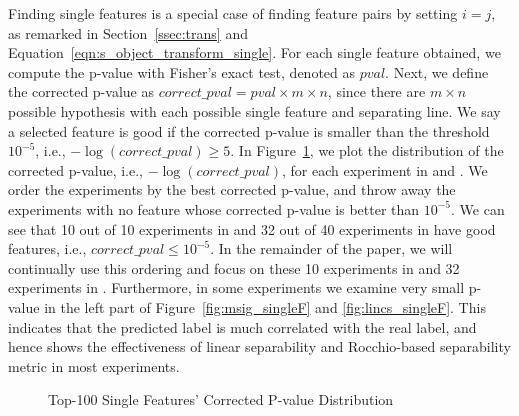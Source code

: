  Finding \topk single features is a special case of finding feature pairs by setting $i=j$, as remarked in Section~\ref{ssec:trans} and Equation~\ref{eqn:s_object_transform_single}. For each single feature obtained, we compute the p-value with Fisher's exact test, denoted as $pval$. Next, we define the corrected p-value as $correct\_pval= pval\times m \times n$, since there are $m \times n$ possible hypothesis with each possible single feature and separating line. We say a selected feature is good if the corrected p-value is smaller than the threshold $10^{-5}$, i.e., $-\log (correct\_pval)\geq5$. In Figure~\ref{fig:singleF}, we plot the distribution of the corrected p-value, i.e., $-\log (correct\_pval)$, for each experiment in \msig and \lincs. We order the experiments by the best corrected p-value, and throw away the experiments with no feature whose corrected p-value is better than $10^{-5}$. We can see that 10 out of 10 experiments in \msig and 32 out of 40 experiments in \lincs have good features, i.e., $correct\_pval \leq 10^{-5}$. In the remainder of the paper, we will continually use this ordering and focus on these 10 experiments in \msig and 32 experiments in \lincs. Furthermore, in some experiments we examine very small p-value in the left part of Figure~\ref{fig:msig_singleF} and \ref{fig:lincs_singleF}. This indicates that the predicted label is much correlated with the real label, and hence shows the effectiveness of linear separability and Rocchio-based separability metric in most experiments.


\begin{figure}[h]
\centering     %
\vspace{-5mm}
\vspace{-5mm}
\caption{Top-100 Single Features' Corrected P-value Distribution}
\vspace{-5mm}
\label{fig:singleF}
\end{figure}

